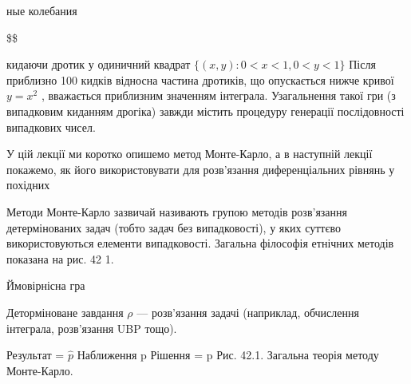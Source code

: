 \documentclass[
  ukrainian,
]{article}
\begin{document}
ные колебания

\$\$

кидаючи дротик у одиничний квадрат \(\{(x, y): 0 < x < 1, 0 < y < 1\}\)
Після приблизно 100 кидків відносна частина дротиків, що опускається
нижче кривої \(y = x^2\) , вважається приблизним значенням інтеграла.
Узагальнення такої гри (з випадковим киданням дрогіка) завжди містить
процедуру генерації послідовності випадкових чисел.

У цій лекції ми коротко опишемо метод Монте-Карло, а в наступній лекції
покажемо, як його використовувати для розв'язання диференціальних
рівнянь у похідних

Методи Монте-Карло зазвичай називають групою методів розв'язання
детермінованих задач (тобто задач без випадковості), у яких суттєво
використовуються елементи випадковості. Загальна філософія етнічних
методів показана на рис. 42 1.

Ймовірнісна гра

Деторміноване завдання \(\rho\) --- розв'язання задачі (наприклад,
обчислення інтеграла, розв'язання UBP тощо).

Результат = \(\hat{p}\) Наближення p Рішення = p Рис. 42.1. Загальна
теорія методу Монте-Карло.
\end{document}
